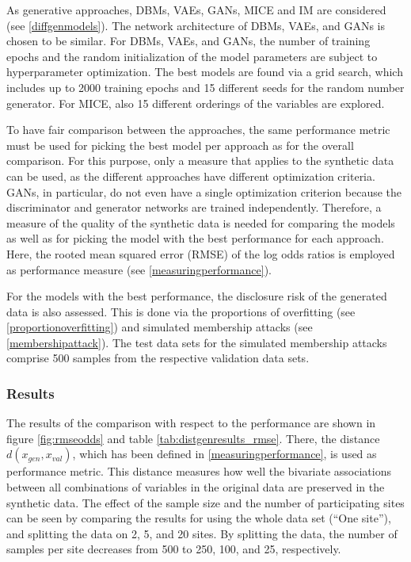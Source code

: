 \documentclass[12pt]{article}
\begin{document}
As generative approaches, DBMs, VAEs, GANs, MICE and IM are considered (see \ref{diffgenmodels}).
The network architecture of DBMs, VAEs, and GANs is chosen to be similar.
For DBMs, VAEs, and GANs, the number of training epochs and the random initialization of the model parameters are subject to hyperparameter optimization.
The best models are found via a grid search, which includes up to 2000 training epochs and 15 different seeds for the random number generator.
For MICE, also 15 different orderings of the variables are explored.

To have fair comparison between the approaches, the same performance metric must be used for picking the best model per approach as for the overall comparison.
For this purpose, only a measure that applies to the synthetic data can be used, as the different approaches have different optimization criteria.
GANs, in particular, do not even have a single optimization criterion because the discriminator and generator networks are trained independently.
Therefore, a measure of the quality of the synthetic data is needed for comparing the models as well as for picking the model with the best performance for each approach.
Here, the rooted mean squared error (RMSE) of the log odds ratios is employed as performance measure (see \ref{measuringperformance}).

For the models with the best performance, the disclosure risk of the generated data is also assessed.
This is done via the proportions of overfitting (see \ref{proportionoverfitting}) and simulated membership attacks (see \ref{membershipattack}).
The test data sets for the simulated membership attacks comprise 500 samples from the respective validation data sets.
 
\FloatBarrier
\subsubsection{Results}

The results of the comparison with respect to the performance are shown in figure \ref{fig:rmseodds} and table \ref{tab:distgenresults_rmse}. 
There, the distance $d(x_{gen},x_{val})$, which has been defined in \ref{measuringperformance}, is used as performance metric.
This distance measures how well the bivariate associations between all combinations of variables in the original data are preserved in the synthetic data.
The effect of the sample size and the number of participating sites can be seen by comparing the results for using the whole data set (``One site''), and splitting the data on 2, 5, and 20 sites.
By splitting the data, the number of samples per site decreases from 500 to 250, 100, and 25, respectively.
\end{document}
